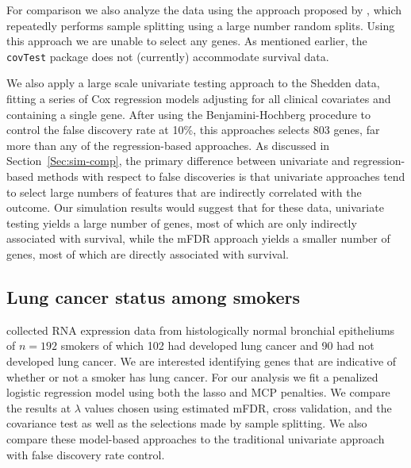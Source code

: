For comparison we also analyze the data using the approach proposed by \citet{Meinshausen2009}, which repeatedly performs sample splitting using a large number random splits. Using this approach we are unable to select any genes.  As mentioned earlier, the {\tt covTest} package does not (currently) accommodate survival data.


We also apply a large scale univariate testing approach to the Shedden data, fitting a series of Cox regression models adjusting for all clinical covariates and containing a single gene.  After using the Benjamini-Hochberg procedure to control the false discovery rate at 10\%, this approaches selects 803 genes, far more than any of the regression-based approaches.  As discussed in Section~\ref{Sec:sim-comp}, the primary difference between univariate and regression-based methods with respect to false discoveries is that univariate approaches tend to select large numbers of features that are indirectly correlated with the outcome.  Our simulation results would suggest that for these data, univariate testing yields a large number of genes, most of which are only indirectly associated with survival, while the mFDR approach yields a smaller number of genes, most of which are directly associated with survival.

\subsection{Lung cancer status among smokers}

\citet{Spira2007} collected RNA expression data from histologically normal bronchial epitheliums of $n = 192$ smokers of which 102 had developed lung cancer and 90 had not developed lung cancer.  We are interested identifying genes that are indicative of whether or not a smoker has lung cancer.  For our analysis we fit a penalized logistic regression model using both the lasso and MCP penalties. We compare the results at $\lambda$ values chosen using estimated mFDR, cross validation, and the covariance test as well as the selections made by sample splitting. We also compare these model-based approaches to the traditional univariate approach with false discovery rate control.

